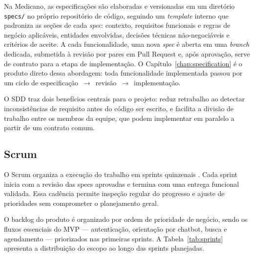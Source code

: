 Na Medicano, as especificações são elaboradas e
versionadas em um diretório \texttt{specs/} no próprio
repositório de código, seguindo um \textit{template}
interno que padroniza as seções de cada \textit{spec}:
contexto, requisitos funcionais e regras de negócio
aplicáveis, entidades envolvidas, decisões técnicas
não-negociáveis e critérios de aceite. A cada
funcionalidade, uma nova \textit{spec} é aberta em uma
\textit{branch} dedicada, submetida à revisão por pares
em Pull Request e, após aprovação, serve de contrato
para a etapa de implementação.
O Capítulo~\ref{chap:specification} é o produto
direto dessa abordagem: toda funcionalidade
implementada passou por um ciclo de
especificação~$\rightarrow$~revisão~$\rightarrow$~implementação.

O SDD traz dois benefícios centrais para o projeto:
reduz retrabalho ao detectar inconsistências de
requisito antes do código ser escrito, e facilita
a divisão de trabalho entre os membros da equipe,
que podem implementar em paralelo a partir de um
contrato comum.

\subsection{Scrum}
\label{subsec:scrum}

O Scrum organiza a execução do trabalho em sprints
quinzenais \cite{schwaber2020}. Cada sprint inicia
com a revisão das specs aprovadas e termina com uma
entrega funcional validada. Essa cadência permite
inspeção regular do progresso e ajuste de prioridades
sem comprometer o planejamento geral.

O backlog do produto é organizado por ordem de
prioridade de negócio, sendo os fluxos essenciais do
MVP — autenticação, orientação por chatbot, busca e
agendamento — priorizados nas primeiras sprints. A
Tabela~\ref{tab:sprints} apresenta a distribuição do
escopo ao longo das sprints planejadas.

